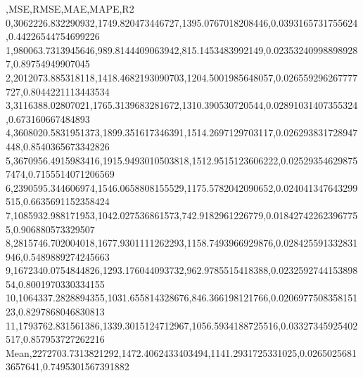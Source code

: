 ,MSE,RMSE,MAE,MAPE,R2
0,3062226.832290932,1749.820473446727,1395.0767018208446,0.0393165731755624,0.44226544754699226
1,980063.7313945646,989.8144409063942,815.1453483992149,0.023532409988989287,0.89754949907045
2,2012073.885318118,1418.4682193090703,1204.5001985648057,0.026559296267777727,0.8044221113443534
3,3116388.02807021,1765.3139683281672,1310.390530720544,0.02891031407355324,0.673160667484893
4,3608020.5831951373,1899.351617346391,1514.2697129703117,0.026293831728947448,0.8540365673342826
5,3670956.4915983416,1915.9493010503818,1512.9515123606222,0.025293546298757474,0.7155514071206569
6,2390595.344606974,1546.0658808155529,1175.5782042090652,0.024041347643299515,0.6635691152358424
7,1085932.988171953,1042.027536861573,742.9182961226779,0.018427422623967755,0.906880573329507
8,2815746.702004018,1677.9301111262293,1158.7493966929876,0.028425591332831946,0.5489889274245663
9,1672340.0754844826,1293.176044093732,962.9785515418388,0.023259274415389854,0.8001970330334155
10,1064337.2828894355,1031.655814328676,846.366198121766,0.020697750835815123,0.8297868046830813
11,1793762.831561386,1339.3015124712967,1056.5934188725516,0.03327345925402517,0.857953727262216
Mean,2272703.7313821292,1472.4062433403494,1141.2931725331025,0.02650256813657641,0.7495301567391882
